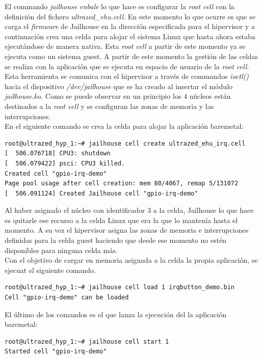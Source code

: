 El commando \textit{jailhouse enbale} lo que hace es configurar la \textit{root cell} con la definición del fichero \textit{ultrazed\_ehu.cell}. En este momento lo que ocurre es que se carga el \textit{firmware} de Jailhouse en la dirección especificada para el hipervisor y a continuación crea una celda para alojar el sistema Linux que hasta ahora estaba ejecutándose de manera nativa. Esta \textit{root cell} a partir de este momento ya se ejecuta como un sistema guest. A partir de este momento la gestión de las celdas se realiza con la aplicación que se ejecuta en espacio de usuario de la \textit{root cell}. Esta herramienta se comunica con el hipervisor a través de commandos \textit{ioctl()} hacia el dispositivo \textit{/dev/jailhouse} que se ha creado al insertar el módulo \textit{jailhouse.ko}.
Como se puede observar en un principio los 4 núcleos están destinados a la \textit{root cell} y se configuran las zonas de memoria y las interrupciones.\\

En el siguiente comando se crea la celda para alojar la aplicación baremetal:

\begin{lstlisting}[style=CStyle]
root@ultrazed_hyp_1:~# jailhouse cell create ultrazed_ehu_irq.cell
[  506.076718] CPU3: shutdown
[  506.079422] psci: CPU3 killed.
Created cell "gpio-irq-demo"
Page pool usage after cell creation: mem 80/4067, remap 5/131072
[  506.091124] Created Jailhouse cell "gpio-irq-demo"
\end{lstlisting}

Al haber asignado el núcleo con identificador 3 a la celda, Jailhouse lo que hace es quitarle ese recurso a la celda Linux que era la que lo mantenía hasta el momento. A su vez el hipervisor asigna las zonas de memoria e interrupciones definidas para la celda guest haciendo que desde ese momento no estén disponibles para ninguna celda más.\\

Con el objetivo de cargar en memoria asignada a la celda la propia aplicación, se ejecuat el siguiente comando.
\begin{lstlisting}[style=CStyle]
root@ultrazed_hyp_1:~# jailhouse cell load 1 irqbutton_demo.bin
Cell "gpio-irq-demo" can be loaded
\end{lstlisting}

El último de los comandos es el que lanza la ejecución del la aplicación baremetal:
\begin{lstlisting}[style=CStyle]
root@ultrazed_hyp_1:~# jailhouse cell start 1
Started cell "gpio-irq-demo"
\end{lstlisting}

